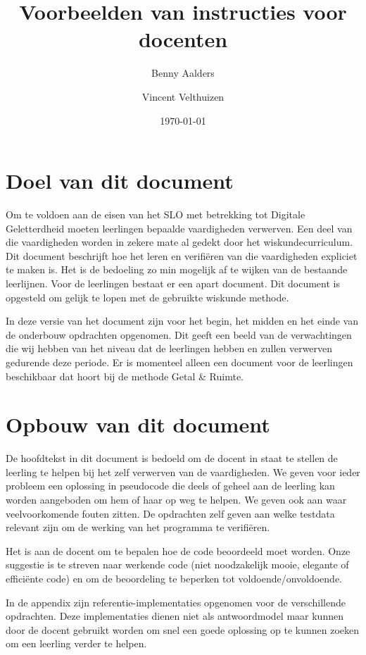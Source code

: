 \documentclass[a4paper,notitlepage]{report}
\author{Benny Aalders \and Vincent Velthuizen}
\title{Voorbeelden van instructies voor docenten}
\date{\today}
\begin{document}
\maketitle

\section{Doel van dit document}
Om te voldoen aan de eisen van het SLO met betrekking tot Digitale Geletterdheid moeten leerlingen bepaalde vaardigheden verwerven. Een deel van die vaardigheden worden in zekere mate al gedekt door het wiskundecurriculum. Dit document beschrijft hoe het leren en verifi\"eren van die vaardigheden expliciet te maken is. Het is de bedoeling zo min mogelijk af te wijken van de bestaande leerlijnen. Voor de leerlingen bestaat er een apart document. Dit document is opgesteld om gelijk te lopen met de gebruikte wiskunde methode.

In deze versie van het document zijn voor het begin, het midden en het einde van de onderbouw opdrachten opgenomen. Dit geeft een beeld van de verwachtingen die wij hebben van het niveau dat de leerlingen hebben en zullen verwerven gedurende deze periode.  Er is momenteel alleen een document voor de leerlingen beschikbaar dat hoort bij  de methode Getal \& Ruimte.

\section{Opbouw van dit document}

De hoofdtekst in dit document is bedoeld om de docent in staat te stellen de leerling te helpen bij het zelf verwerven van de vaardigheden. We geven voor ieder probleem een oplossing in pseudocode die deels of geheel aan de leerling kan worden aangeboden om hem of haar op weg te helpen. We geven ook aan waar veelvoorkomende fouten zitten. De opdrachten zelf geven aan welke testdata relevant zijn om de werking van het programma te verifi\"eren.

Het is aan de docent om te bepalen hoe de code beoordeeld moet worden. Onze suggestie is te streven naar werkende code (niet noodzakelijk mooie, elegante of effici\"ente code) en om de beoordeling te beperken tot voldoende/onvoldoende.

In de appendix zijn referentie-implementaties opgenomen voor de verschillende opdrachten. Deze implementaties dienen niet als antwoordmodel maar kunnen door de docent gebruikt worden om snel een goede oplossing op te kunnen zoeken om een leerling verder te helpen.
\end{document}
